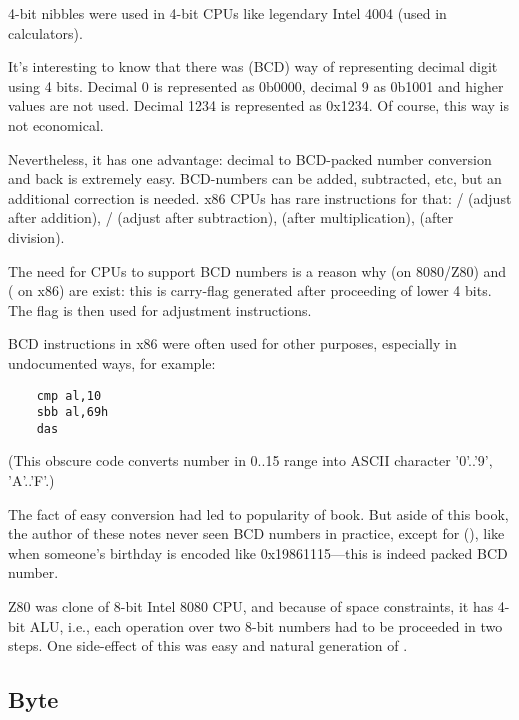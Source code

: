 
4-bit nibbles were used in 4-bit CPUs like legendary Intel 4004 (used in calculators).

It's interesting to know that there was  (\ac{BCD}) way of representing decimal digit using 4 bits.
Decimal 0 is represented as 0b0000, decimal 9 as 0b1001 and higher values are not used.
Decimal 1234 is represented as 0x1234.
Of course, this way is not economical.

Nevertheless, it has one advantage: decimal to \ac{BCD}-packed number conversion and back is extremely easy.
BCD-numbers can be added, subtracted, etc, but an additional correction is needed.
x86 CPUs has rare instructions for that:
/ (adjust after addition),
/ (adjust after subtraction),
 (after multiplication),
 (after division).

The need for CPUs to support \ac{BCD} numbers is a reason why  (on 8080/Z80) and
 ( on x86)
are exist: this is carry-flag generated after proceeding of lower 4 bits. The flag is then used for adjustment instructions.

\ac{BCD} instructions in x86 were often used for other purposes, especially in undocumented ways, for example:

\begin{lstlisting}
	cmp al,10
	sbb al,69h
	das
\end{lstlisting}

(This obscure code converts number in 0..15 range into \ac{ASCII} character '0'..'9', 'A'..'F'.)

The fact of easy conversion had led to popularity of
 book.
But aside of this book, the author of these notes never seen \ac{BCD} numbers in practice, except for
 (),
like when someone's birthday is encoded like 0x19861115---this is indeed packed \ac{BCD} number.


Z80 was clone of 8-bit Intel 8080 CPU, and because of space constraints, it has 4-bit \ac{ALU}, i.e., each operation
over two 8-bit numbers had to be proceeded in two steps.
One side-effect of this was easy and natural generation of .

\subsection{Byte}

